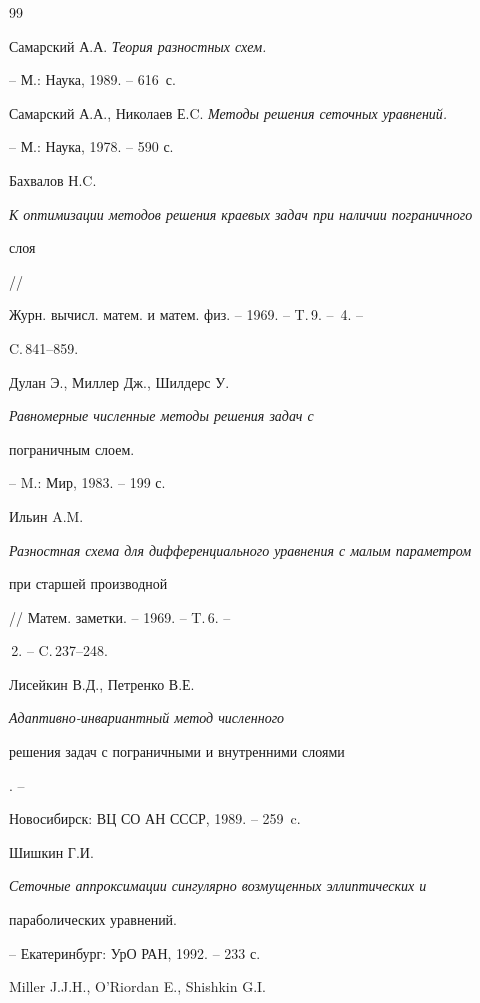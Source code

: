\begin{thebibliography}{99}







Самарский А.А. {\it Теория разностных схем.}


-- М.: Наука,  1989. -- 616~с.




Самарский А.А., Николаев Е.C. {\it Методы решения сеточных уравнений.}


--  М.: Наука,  1978. -- 590 с.




Бахвалов Н.C.


{\it К оптимизации методов решения краевых задач при наличии пограничного


слоя} //


Журн. вычисл. матем. и матем. физ. -- 1969. -- T.\,9. -- \No\,4. --


C.\,841--859.




Дулан Э.,  Миллер Дж.,  Шилдерс У.


{\it Равномерные численные методы решения задач с


пограничным слоем.} -- M.: Мир,  1983. -- 199 с.




Ильин A.M.


{\it Разностная схема для дифференциального уравнения с малым параметром


при старшей производной} // Матем. заметки. -- 1969. -- T.\,6. --


\No\,2. -- C.\,237--248.




Лисейкин В.Д., Петренко В.Е.


{\it Адаптивно-инвариантный метод численного


решения задач с пограничными и внутренними слоями}. --


Новосибирск: ВЦ СО АН СССР, 1989. -- 259~c.




Шишкин Г.И.


{\it Сеточные аппроксимации сингулярно возмущенных эллиптических и


параболических уравнений.} -- Екатеринбург: УрО РАН,  1992. -- 233 с.




Miller J.J.H., O'Riordan E., Shishkin G.I. {\it


}
\end{thebibliography}

